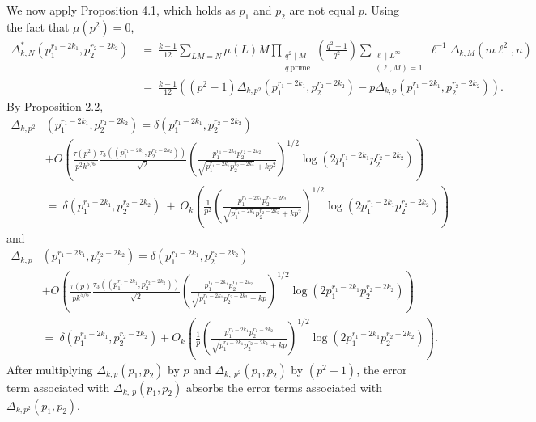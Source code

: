 \documentclass[11pt, reqno]{amsart}
\theoremstyle{definition}
\theoremstyle{remark}
\numberwithin{equation}{section}
\begin{document}
We now apply \cite{BarrettEtAl2016arXiv} Proposition 4.1, which holds as $p_1$ and $p_2$ are not equal $p$. Using the fact that $\mu(p^2)=0$,
\begin{align*}
    \Delta^*_{k,N}\left(p_1^{r_1-2k_1}, p_2^{r_2-2k_2}\right)\ &=\ \frac{k-1}{12}\sum_{LM=N}\mu(L)M\prod_{\substack{q^2 \mid M \\ q \ \textrm{prime}}}\left(\frac{q^2-1}{q^2} \right)\sum_{\substack{\ell \mid L^\infty\\ (\ell, M)=1}}\ell^{-1}\Delta_{k,M}(m\ell^2,n) \\
    \ &=\ \frac{k-1}{12} \left((p^2-1)\Delta_{k,p^2}\left(p_1^{r_1-2k_1}, p_2^{r_2-2k_2}\right)-p\Delta_{k,p}\left(p_1^{r_1-2k_1}, p_2^{r_2-2k_2}\right)\right).
\end{align*}
By \cite{ILS2} Proposition 2.2,
\begin{align*}
    \Delta_{k,p^2}&\left(p_1^{r_1-2k_1}, p_2^{r_2-2k_2}\right) = \delta\left(p_1^{r_1-2k_1}, p_2^{r_2-2k_2}\right) \\ &+O\left( \frac{\tau(p^2)}{p^2k^{5/6}}\frac{\tau_3\left(\left(p_1^{r_1-2k_1}, p_2^{r_2-2k_2}\right)\right)}{\sqrt{2}}\left( \frac{p_1^{r_1-2k_1}p_2^{r_2-2k_2}}{\sqrt{p_1^{r_1-2k_1}p_2^{r_2-2k_2}}+kp^2}\right)^{1/2}\log\left(2p_1^{r_1-2k_1}p_2^{r_2-2k_2}\right)\right) \\
    &=\ \delta(p_1^{r_1-2k_1},p_2^{r_2-2k_2}) \ + \ O_k\left(\frac{1}{p^2}\left( \frac{p_1^{r_1-2k_1}p_2^{r_2-2k_2}}{\sqrt{p_1^{r_1-2k_1}p_2^{r_2-2k_2}}+kp^2}\right)^{1/2}\log\left(2p_1^{r_1-2k_1}p_2^{r_2-2k_2}\right) \right)
\end{align*}
and
\begin{align*}
    \Delta_{k,p}&\left(p_1^{r_1-2k_1}, p_2^{r_2-2k_2}\right) = \delta\left(p_1^{r_1-2k_1}, p_2^{r_2-2k_2}\right)\\ &+O\left( \frac{\tau(p)}{pk^{5/6}}\frac{\tau_3\left(\left(p_1^{r_1-2k_1}, p_2^{r_2-2k_2}\right)\right)}{\sqrt{2}}\left( \frac{p_1^{r_1-2k_1}p_2^{r_2-2k_2}}{\sqrt{p_1^{r_1-2k_1}p_2^{r_2-2k_2}}+kp}\right)^{1/2}\log\left(2p_1^{r_1-2k_1}p_2^{r_2-2k_2}\right)\right) \\
    &=\ \delta\left(p_1^{r_1-2k_1}, p_2^{r_2-2k_2}\right)+O_k\left( \frac{1}{p}\left( \frac{p_1^{r_1-2k_1}p_2^{r_2-2k_2}}{\sqrt{p_1^{r_1-2k_1}p_2^{r_2-2k_2}}+kp}\right)^{1/2}\log\left(2p_1^{r_1-2k_1}p_2^{r_2-2k_2}\right)\right).
\end{align*}
After multiplying $\Delta_{k,p}(p_1, p_2)$ by $p$ and $\Delta_{k,~p^2}(p_1, p_2)$ by $(p^2-1)$, the error term associated with $\Delta_{k,~p}(p_1, p_2)$ absorbs the error terms associated with $\Delta_{k,p^2}(p_1, p_2)$.
\end{document}
